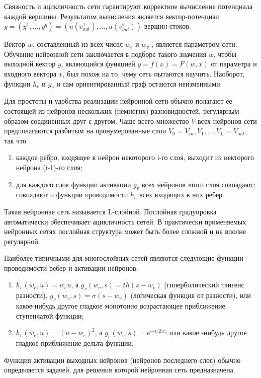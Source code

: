 \documentclass[a4paper,12pt]{report}
\numberwithin{equation}{section}
\begin{document}
Связность и ацикличность сети гарантируют корректное вычисление потенциала
каждой вершины. Результатом вычисления является вектор-потенциал $y =
(y^1,\dots,y^q) = (u(v_{out}^1),\dots,u(v_{out}^q))$ вершин-стоков.


Вектор $w$, составленный из всех чисел $w_e$ и $w_v$ , является параметром
сети. Обучение нейронной сети заключается в подборе такого значения $w$, чтобы
выходной вектор $y$, являющийся функцией $y = f(x) = F(w, x)$ от параметра и
входного вектора $x$, был похож на то, чему сеть пытаются научить. Наоборот,
функции $h_e$ и $g_v$ и сам ориентированный граф остаются неизменными.


Для простоты и удобства реализации нейронной сети обычно полагают ее состоящей
из нейронов нескольких (немногих) разновидностей, регулярным образом соединенных
друг с другом. Чаще всего множество $V$ всех нейронов сети предполагаются
разбитым на пронумерованные слои $V_0 = V_{in}, V_1,\dots,V_L = V_{out}$, так
что
\begin{enumerate}
\item каждое ребро, входящее в нейрон некоторого i-го слоя, выходит из некторого
нейрона (i-1)-го слоя;
\item для каждого слоя функции активации $g_v$ всех нейронов этого слоя
совпадают; совпадают и функции проводимости $h_e$ всех входящих в них ребер.
\end{enumerate}

Такая нейронная сеть называется L-слойной. Послойная градуировка автоматически
обеспечивает ацикличность сетей. В практически применяемых нейронных сетях
послойная структура может быть более сложной и не вполне регулярной.


Наиболее типичными для многослойных сетей являются следующие функции
проводимости ребер и активации нейронов:
\begin{enumerate}
\item $h_e(w_e,u) = w_eu$, а $g_v(w_v,s) = th(s - w_v)$ (гиперболический тангенс
разности), $g_v(w_v,s) = \sigma(s-w_v)$ (логическая функция от разности), или
какое-нибудь другое гладкое монотонно возрастающее приближение ступенчатой
функции;
\item $h_e(w_e,u) = (u - w_e)^2$, а $g_v(w_v,s) = e^{-s/2w_v}$ или какое -нибудь
другое гладкое приближение дельта-функции.
\end{enumerate} Функция активации выходных нейронов (нейронов последнего слоя)
обычно определяется задачей, для решения которой нейронная сеть предназначена.
\end{document}
